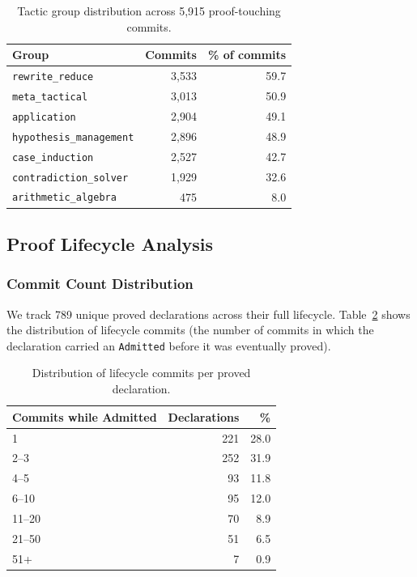 \documentclass[11pt]{article}
\begin{document}
\begin{table}[h]
\centering
\caption{Tactic group distribution across 5,915 proof-touching commits.}
\label{tab:groups_commits}
\begin{tabular}{lrr}
\toprule
Group & Commits & \% of commits \\
\midrule
\texttt{rewrite\_reduce} & 3,533 & 59.7 \\
\texttt{meta\_tactical} & 3,013 & 50.9 \\
\texttt{application} & 2,904 & 49.1 \\
\texttt{hypothesis\_management} & 2,896 & 48.9 \\
\texttt{case\_induction} & 2,527 & 42.7 \\
\texttt{contradiction\_solver} & 1,929 & 32.6 \\
\texttt{arithmetic\_algebra} & 475 & 8.0 \\
\bottomrule
\end{tabular}
\end{table}

\subsection{Proof Lifecycle Analysis}

\subsubsection{Commit Count Distribution}

We track 789 unique proved declarations across their full lifecycle. Table~\ref{tab:lifecycle_dist} shows the distribution of lifecycle commits (the number of commits in which the declaration carried an \texttt{Admitted} before it was eventually proved).

\begin{table}[h]
\centering
\caption{Distribution of lifecycle commits per proved declaration.}
\label{tab:lifecycle_dist}
\begin{tabular}{lrr}
\toprule
Commits while Admitted & Declarations & \% \\
\midrule
1 & 221 & 28.0 \\
2--3 & 252 & 31.9 \\
4--5 & 93 & 11.8 \\
6--10 & 95 & 12.0 \\
11--20 & 70 & 8.9 \\
21--50 & 51 & 6.5 \\
51+ & 7 & 0.9 \\
\bottomrule
\end{tabular}
\end{table}
\end{document}
